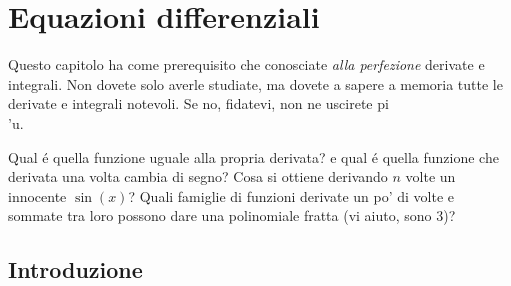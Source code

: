 \label{Equazioni differenziali}
\chapter{Equazioni differenziali}

Questo capitolo ha come prerequisito che conosciate {\em alla perfezione} derivate e integrali.
Non dovete solo averle studiate, ma dovete a sapere a memoria tutte le derivate e integrali notevoli. Se no, fidatevi, non ne uscirete pi\\'u.

\begin{prerequisito}
Qual \'e quella funzione uguale alla propria derivata? e qual \'e quella funzione che derivata una volta cambia di segno?
Cosa si ottiene derivando $n$ volte un innocente $\sin(x)$? Quali famiglie di funzioni derivate un po' di volte e sommate tra loro possono dare una polinomiale fratta (vi aiuto, sono 3)?
\end{prerequisito}


\section{Introduzione}



